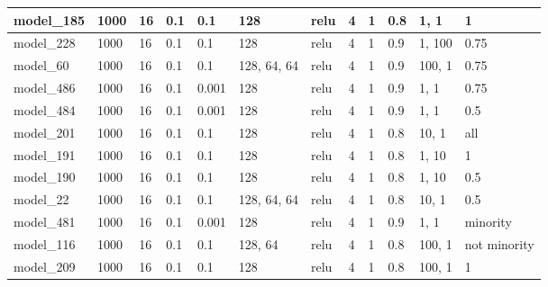 \begin{tabular}{|l|l|l|l|l|l|l|l|l|l|l|l|}
model\_185     & 1000           & 16           & 0.1          & 0.1          & 128         & relu         & 4           & 1            & 0.8               & 1, 1             & 1                           \\ \hline
model\_228     & 1000           & 16           & 0.1          & 0.1          & 128         & relu         & 4           & 1            & 0.9               & 1, 100           & 0.75                        \\ \hline
model\_60      & 1000           & 16           & 0.1          & 0.1          & 128, 64, 64 & relu         & 4           & 1            & 0.9               & 100, 1           & 0.75                        \\ \hline
model\_486     & 1000           & 16           & 0.1          & 0.001        & 128         & relu         & 4           & 1            & 0.9               & 1, 1             & 0.75                        \\ \hline
model\_484     & 1000           & 16           & 0.1          & 0.001        & 128         & relu         & 4           & 1            & 0.9               & 1, 1             & 0.5                         \\ \hline
model\_201     & 1000           & 16           & 0.1          & 0.1          & 128         & relu         & 4           & 1            & 0.8               & 10, 1            & all                         \\ \hline
model\_191     & 1000           & 16           & 0.1          & 0.1          & 128         & relu         & 4           & 1            & 0.8               & 1, 10            & 1                           \\ \hline
model\_190     & 1000           & 16           & 0.1          & 0.1          & 128         & relu         & 4           & 1            & 0.8               & 1, 10            & 0.5                         \\ \hline
model\_22      & 1000           & 16           & 0.1          & 0.1          & 128, 64, 64 & relu         & 4           & 1            & 0.8               & 10, 1            & 0.5                         \\ \hline
model\_481     & 1000           & 16           & 0.1          & 0.001        & 128         & relu         & 4           & 1            & 0.9               & 1, 1             & minority                    \\ \hline
model\_116     & 1000           & 16           & 0.1          & 0.1          & 128, 64     & relu         & 4           & 1            & 0.8               & 100, 1           & not minority                \\ \hline
model\_209     & 1000           & 16           & 0.1          & 0.1          & 128         & relu         & 4           & 1            & 0.8               & 100, 1           & 1                           \\ \hline
\end{tabular}